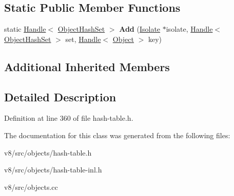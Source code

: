 \subsection*{Static Public Member Functions}
\begin{DoxyCompactItemize}
\item 
\mbox{\label{classv8_1_1internal_1_1ObjectHashSet_a39db58bacd3881a3161955d66e327c6e}} 
static \mbox{\hyperlink{classv8_1_1internal_1_1Handle}{Handle}}$<$ \mbox{\hyperlink{classv8_1_1internal_1_1ObjectHashSet}{Object\+Hash\+Set}} $>$ {\bfseries Add} (\mbox{\hyperlink{classv8_1_1internal_1_1Isolate}{Isolate}} $\ast$isolate, \mbox{\hyperlink{classv8_1_1internal_1_1Handle}{Handle}}$<$ \mbox{\hyperlink{classv8_1_1internal_1_1ObjectHashSet}{Object\+Hash\+Set}} $>$ set, \mbox{\hyperlink{classv8_1_1internal_1_1Handle}{Handle}}$<$ \mbox{\hyperlink{classv8_1_1internal_1_1Object}{Object}} $>$ key)
\end{DoxyCompactItemize}
\subsection*{Additional Inherited Members}


\subsection{Detailed Description}


Definition at line 360 of file hash-\/table.\+h.



The documentation for this class was generated from the following files\+:\begin{DoxyCompactItemize}
\item 
v8/src/objects/hash-\/table.\+h\item 
v8/src/objects/hash-\/table-\/inl.\+h\item 
v8/src/objects.\+cc\end{DoxyCompactItemize}
